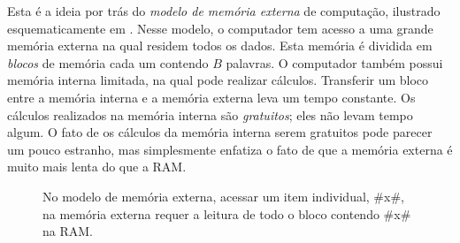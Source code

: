 
Esta é a ideia por trás do \emph{modelo de memória externa}
%
de computação,
ilustrado esquematicamente em . Nesse modelo, o computador tem acesso a uma grande memória externa na qual residem todos os dados.
Esta memória é dividida em \emph{blocos} de memória 
%
cada um contendo $B$
palavras.  O computador também possui memória interna limitada, na qual pode realizar cálculos. Transferir um bloco entre a memória interna e a memória externa leva um tempo constante. Os cálculos realizados na memória interna são \emph{gratuitos}; eles não levam tempo algum. O fato de os cálculos da memória interna serem gratuitos pode parecer um pouco estranho, mas simplesmente enfatiza o fato de que a memória externa é muito mais lenta do que a RAM.

\begin{figure}
  \caption[O modelo de memória externa]{No modelo de memória externa, acessar um item individual, #x#, na memória externa requer a leitura de todo o bloco contendo #x# na RAM.}
\end{figure}

